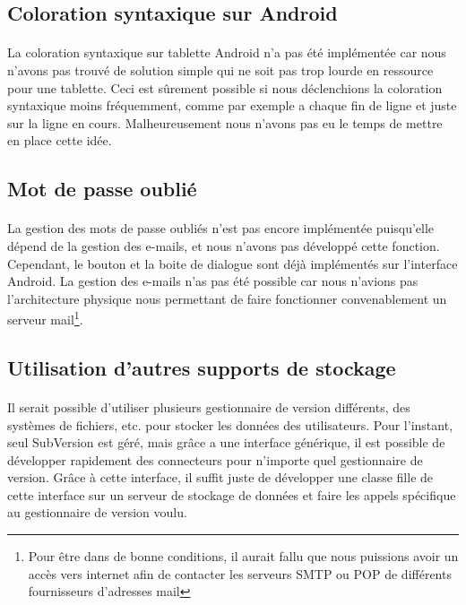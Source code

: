 \documentclass[a4paper,12pt]{article}
\begin{document}
\subsection{Coloration syntaxique sur Android}
\paragraph*{}
La coloration syntaxique sur tablette Android n'a pas été implémentée car nous n'avons pas trouvé de solution simple qui ne soit pas trop lourde en ressource pour une tablette. Ceci est sûrement possible si nous déclenchions la coloration syntaxique moins fréquemment, comme par exemple a chaque fin de ligne et juste sur la ligne en cours. Malheureusement nous n'avons pas eu le temps de mettre en place cette idée.

\subsection{Mot de passe oublié}
\paragraph*{}
La gestion des mots de passe oubliés n'est pas encore implémentée puisqu'elle dépend de la gestion des e-mails, et nous n'avons pas développé cette fonction. Cependant, le bouton et la boite de dialogue sont déjà implémentés sur l'interface Android. La gestion des e-mails n'as pas été possible car nous n'avions pas l'architecture physique nous permettant de faire fonctionner convenablement un serveur mail\footnote{Pour être dans de bonne conditions, il aurait fallu que nous puissions avoir un accès vers internet afin de contacter les serveurs SMTP ou POP de différents fournisseurs d'adresses mail}.

\subsection{Utilisation d'autres supports de stockage}
\paragraph*{}
Il serait possible d'utiliser plusieurs gestionnaire de version différents, des systèmes de fichiers, etc. pour stocker les données des utilisateurs. Pour l'instant, seul SubVersion est géré, mais grâce a une interface générique, il est possible de développer rapidement des connecteurs pour n'importe quel gestionnaire de version. Grâce à cette interface, il suffit juste de développer une classe fille de cette interface sur un serveur de stockage de données et faire les appels spécifique au gestionnaire de version voulu.
\end{document}
